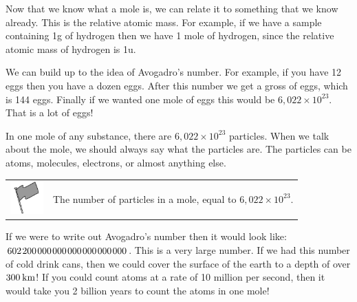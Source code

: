 \label{m38717*eip-392}Now that we know what a mole is, we can relate it to something that we know already. This is the relative atomic mass. For example, if we have a sample containing 1g of hydrogen then we have 1 mole of hydrogen, since the relative atomic mass of hydrogen is 1u.\par \label{m38717*eip-503}We can build up to the idea of Avogadro's number. For example, if you have 12 eggs then you have a dozen eggs. After this number we get a gross of eggs, which is 144 eggs. Finally if we wanted one mole of eggs this would be $6,022\ensuremath{\times}{10}^{23}$. That is a lot of eggs!\par \label{m38717*eip-460}In one mole of any substance, there are $6,022\ensuremath{\times}{10}^{23}$ particles. When we talk about the mole, we should always say what the particles are. The particles can be atoms, molecules, electrons, or almost anything else.\par \label{m38717*fhsst!!!underscore!!!id123}\begin{definition}
	  \begin{tabular*}{15 cm}{m{15 mm}m{}}
	\hspace*{-50pt}  \includegraphics[width=0.5in]{col11305.imgs/psflag2.png}   & \Definition{   \label{id2496617}\textbf{ Avogadro's number }} { \label{m38717*meaningfhsst!!!underscore!!!id123}
      \label{m38717*id276010}The number of particles in a mole, equal to $6,022\ensuremath{\times}{10}^{23}$. \par 
       } 
      \end{tabular*}
      \end{definition}
\label{m38717*eip-446}If we were to write out Avogadro's number then it would look like:
$602\phantom{\rule{1pt}{0ex}}200\phantom{\rule{1pt}{0ex}}000\phantom{\rule{1pt}{0ex}}000\phantom{\rule{1pt}{0ex}}000\phantom{\rule{1pt}{0ex}}000\phantom{\rule{1pt}{0ex}}000\phantom{\rule{1pt}{0ex}}000$. This is a very large number. If we had this number of cold drink cans, then we could cover the surface of the earth to a depth of over $300\phantom{\rule{2pt}{0ex}}\mathrm{km}$! If you could count atoms at a rate of 10 million per second, then it would take you 2 billion years to count the atoms in one mole!\par \label{m38717*notfhsst!!!underscore!!!id126}
